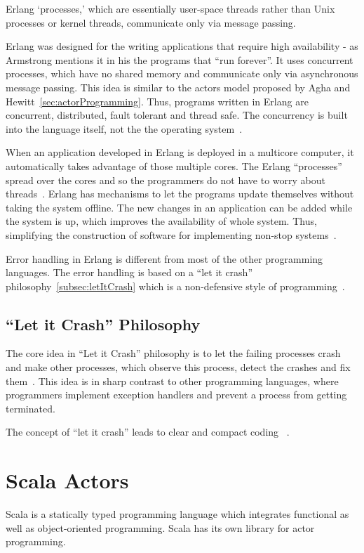   Erlang ‘processes,’ which are essentially user-space threads rather than Unix processes or kernel threads, communicate only via message passing.

  Erlang was designed for the writing applications that require high availability - as Armstrong mentions it in his \cite{armstrong} the programs that “run forever”. It uses concurrent processes, which have no shared memory and communicate only via asynchronous message passing. This idea is similar to the actors model proposed by Agha and Hewitt~\autoref{sec:actorProgramming}. Thus, programs written in Erlang are concurrent, distributed, fault tolerant and thread safe. The concurrency is built into the language itself, not the the operating system~\cite{Armstrong:2010:ERL:1810891.1810910}.

  When an application developed in Erlang is deployed in a multicore computer, it automatically takes advantage of those multiple cores. The Erlang “processes” spread over the cores and so the programmers do not have to worry about threads~\cite{Armstrong:2010:ERL:1810891.1810910}. Erlang has mechanisms to let the programs update themselves without taking the system offline. The new changes in an application can be added while the system is up, which improves the availability of whole system. Thus, simplifying the construction of software for implementing non-stop systems~\cite{armstrong}.

  Error handling in Erlang is different from most of the other programming languages. The error handling is based on a “let it crash” philosophy~\autoref{subsec:letItCrash} which is a non-defensive style of programming~\cite{armstrong, Armstrong:2010:ERL:1810891.1810910}.

\subsection{“Let it Crash” Philosophy}
\label{subsec:letItCrash}
  The core idea in “Let it Crash” philosophy is to let the failing processes crash and make other processes, which observe this process, detect the crashes and fix them~\cite{Armstrong:2010:ERL:1810891.1810910}. This idea is in sharp contrast to other programming languages, where programmers implement exception handlers and prevent a process from getting terminated.

  The concept of “let it crash” leads to clear and compact coding
~\cite{Armstrong:2010:ERL:1810891.1810910}.

\section{Scala Actors}
Scala is a statically typed programming language which integrates functional as well as object-oriented programming\cite{Odersky}. Scala has its own library for actor programming.

